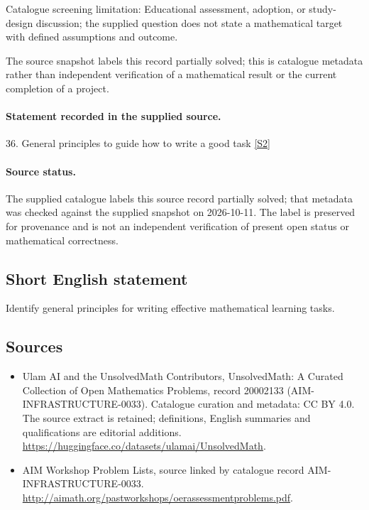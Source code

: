 \documentclass[11pt]{article}
\begin{document}
Catalogue screening limitation: Educational assessment, adoption, or study-design discussion; the supplied question does not state a mathematical target with defined assumptions and outcome.

The source snapshot labels this record partially solved; this is catalogue metadata rather than independent verification of a mathematical result or the current completion of a project.
\paragraph{Statement recorded in the supplied source.}
36. General principles to guide how to write a good task \href{http://aimath.org/pastworkshops/oerassessmentproblems.pdf}{[S2]}
\paragraph{Source status.}
The supplied catalogue labels this source record partially solved; that metadata was checked against the supplied snapshot on 2026-10-11. The label is preserved for provenance and is not an independent verification of present open status or mathematical correctness.
\subsection{Short English statement}
Identify general principles for writing effective mathematical learning tasks.
\subsection{Sources}
\begin{itemize}
\item[S1] Ulam AI and the UnsolvedMath Contributors, UnsolvedMath: A Curated Collection of Open Mathematics Problems, record 20002133 (AIM-INFRASTRUCTURE-0033). Catalogue curation and metadata: CC BY 4.0. The source extract is retained; definitions, English summaries and qualifications are editorial additions.
\url{https://huggingface.co/datasets/ulamai/UnsolvedMath}.
\item[S2] AIM Workshop Problem Lists, source linked by catalogue record AIM-INFRASTRUCTURE-0033.
\url{http://aimath.org/pastworkshops/oerassessmentproblems.pdf}.
\end{itemize}
\end{document}
